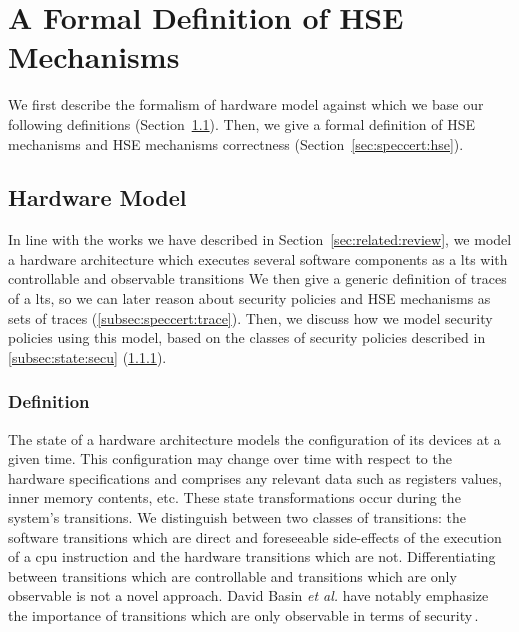 \chapter{A Formal Definition of HSE Mechanisms}
\label{chapter:speccert}

We first describe the formalism of hardware model against which we base our
following definitions (Section~\ref{subsec:speccert:hardware}).
%
Then, we give a formal definition of HSE mechanisms and HSE mechanisms
correctness (Section~\ref{sec:speccert:hse}).

\section{Hardware Model}
\label{subsec:speccert:hardware}

In line with the works we have described in Section~\ref{sec:related:review}, we
model a hardware architecture which executes several software components as a
\ac{lts} with controllable and observable transitions
%
We then give a generic definition of traces of a \ac{lts}, so we can later reason
about security policies and HSE mechanisms as sets of traces
(\ref{subsec:speccert:trace}).
%
Then, we discuss how we model security policies using this model, based on the
classes of security policies described in \ref{subsec:state:secu}
(\ref{subsec:speccert:def}).

\subsection{Definition}
\label{subsec:speccert:def}

The state of a hardware architecture models the configuration of its devices at
a given time.
%
This configuration may change over time with respect to the hardware
specifications and comprises any relevant data such as registers values, inner
memory contents, etc.
%
These state transformations occur during the system's transitions.
%
We distinguish between two classes of transitions: the software transitions
which are direct and foreseeable side-effects of the execution of a \ac{cpu}
instruction and the hardware transitions which are not.
%
Differentiating between transitions which are controllable and transitions which
are only observable is not a novel approach.
%
David Basin \emph{et al.} have notably emphasize the importance of transitions
which are only observable in terms of security\,\cite{basin2013enforceable}.

